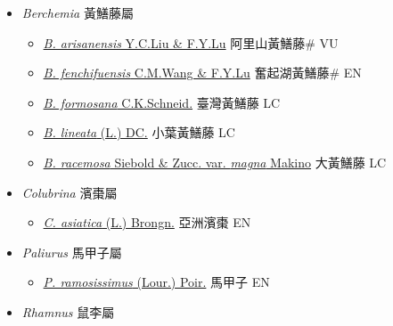 
  \begin{itemize}
 \item[] \textit{Berchemia} 黃鱔藤屬
                    
  \begin{itemize}
        \item[] \href{http://www.theplantlist.org/tpl1.1/search?q=Berchemia+arisanensis}{\textit{B. arisanensis} Y.C.Liu \& F.Y.Lu}   阿里山黃鱔藤\# VU
        \item[] \href{http://www.theplantlist.org/tpl1.1/search?q=Berchemia+fenchifuensis}{\textit{B. fenchifuensis} C.M.Wang \& F.Y.Lu}   奮起湖黃鱔藤\# EN
        \item[] \href{http://www.theplantlist.org/tpl1.1/search?q=Berchemia+formosana}{\textit{B. formosana} C.K.Schneid.}   臺灣黃鱔藤 LC
        \item[] \href{http://www.theplantlist.org/tpl1.1/search?q=Berchemia+lineata}{\textit{B. lineata} (L.) DC.}   小葉黃鱔藤 LC
        \item[] \href{http://www.theplantlist.org/tpl1.1/search?q=Berchemia+racemosa+var.+magna}{\textit{B. racemosa} Siebold \& Zucc. var. \textit{magna} Makino}   大黃鱔藤 LC
  \end{itemize}
 \item[] \textit{Colubrina} 濱棗屬
                    
  \begin{itemize}
        \item[] \href{http://www.theplantlist.org/tpl1.1/search?q=Colubrina+asiatica}{\textit{C. asiatica} (L.) Brongn.}   亞洲濱棗 EN
  \end{itemize}
 \item[] \textit{Paliurus} 馬甲子屬
                    
  \begin{itemize}
        \item[] \href{http://www.theplantlist.org/tpl1.1/search?q=Paliurus+ramosissimus}{\textit{P. ramosissimus} (Lour.) Poir.}   馬甲子 EN
  \end{itemize}
 \item[] \textit{Rhamnus} 鼠李屬
                    

\end{itemize}
